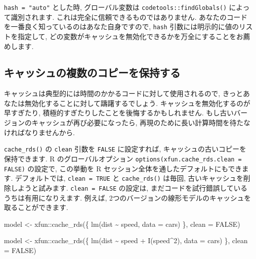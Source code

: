 \documentclass[
  11pt,
  lualatex,
  ja=standard]{bxjsreport}
\newenvironment{Shaded}{\begin{snugshade}}{\end{snugshade}}
\newcommand{\AttributeTok}[1]{\textcolor[rgb]{0.77,0.63,0.00}{#1}}
\newcommand{\ConstantTok}[1]{\textcolor[rgb]{0.00,0.00,0.00}{#1}}
\newcommand{\DecValTok}[1]{\textcolor[rgb]{0.00,0.00,0.81}{#1}}
\newcommand{\FunctionTok}[1]{\textcolor[rgb]{0.00,0.00,0.00}{#1}}
\newcommand{\NormalTok}[1]{#1}
\newcommand{\OtherTok}[1]{\textcolor[rgb]{0.56,0.35,0.01}{#1}}
\newcommand{\SpecialCharTok}[1]{\textcolor[rgb]{0.00,0.00,0.00}{#1}}
\begin{document}
\texttt{hash = "auto"} とした時, グローバル変数は \texttt{codetools::findGlobals()} によって識別されます. これは完全に信頼できるものではありません. あなたのコードを一番良く知っているのはあなた自身ですので, \texttt{hash} 引数には明示的に値のリストを指定して, どの変数がキャッシュを無効化できるかを万全にすることをお薦めします.

\hypertarget{ux30adux30e3ux30c3ux30b7ux30e5ux306eux8907ux6570ux306eux30b3ux30d4ux30fcux3092ux4fddux6301ux3059ux308b}{%
\subsection{キャッシュの複数のコピーを保持する}\label{ux30adux30e3ux30c3ux30b7ux30e5ux306eux8907ux6570ux306eux30b3ux30d4ux30fcux3092ux4fddux6301ux3059ux308b}}

キャッシュは典型的には時間のかかるコードに対して使用されるので, きっとあなたは無効化することに対して躊躇するでしょう. キャッシュを無効化するのが早すぎたり, 積極的すぎたりしたことを後悔するかもしれません. もし古いバージョンのキャッシュが再び必要になったら, 再現のために長い計算時間を待たなければなりませんから.

\texttt{cache\_rds()} の \texttt{clean} 引数を \texttt{FALSE} に設定すれば, キャッシュの古いコピーを保持できます. R のグローバルオプション \texttt{options(xfun.cache\_rds.clean = FALSE)} の設定で, この挙動を R セッション全体を通したデフォルトにもできます. デフォルトでは, \texttt{clean = TRUE} と \texttt{cache\_rds()} は毎回, 古いキャッシュを削除しようと試みます. \texttt{clean = FALSE} の設定は, まだコードを試行錯誤しているうちは有用になりえます. 例えば, 2つのバージョンの線形モデルのキャッシュを取ることができます.

\begin{Shaded}
\begin{Highlighting}[numbers=left,,]
\NormalTok{model }\OtherTok{\textless{}{-}}\NormalTok{ xfun}\SpecialCharTok{::}\FunctionTok{cache\_rds}\NormalTok{(\{}
  \FunctionTok{lm}\NormalTok{(dist }\SpecialCharTok{\textasciitilde{}}\NormalTok{ speed, }\AttributeTok{data =}\NormalTok{ cars)}
\NormalTok{\}, }\AttributeTok{clean =} \ConstantTok{FALSE}\NormalTok{)}

\NormalTok{model }\OtherTok{\textless{}{-}}\NormalTok{ xfun}\SpecialCharTok{::}\FunctionTok{cache\_rds}\NormalTok{(\{}
  \FunctionTok{lm}\NormalTok{(dist }\SpecialCharTok{\textasciitilde{}}\NormalTok{ speed }\SpecialCharTok{+} \FunctionTok{I}\NormalTok{(speed}\SpecialCharTok{\^{}}\DecValTok{2}\NormalTok{), }\AttributeTok{data =}\NormalTok{ cars)}
\NormalTok{\}, }\AttributeTok{clean =} \ConstantTok{FALSE}\NormalTok{)}
\end{Highlighting}
\end{Shaded}
\end{document}
